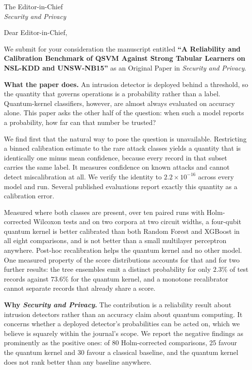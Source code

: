 \documentclass[11pt]{letter}
\begin{document}
\begin{letter}{%
  The Editor-in-Chief\\
  \textit{Security and Privacy}}

\opening{Dear Editor-in-Chief,}

We submit for your consideration the manuscript entitled \textbf{``A Reliability
and Calibration Benchmark of QSVM Against Strong Tabular Learners on NSL-KDD and
UNSW-NB15''} as an Original Paper in \textit{Security and Privacy}.

\medskip
\noindent\textbf{What the paper does.}
An intrusion detector is deployed behind a threshold, so the quantity that governs
operations is a probability rather than a label. Quantum-kernel classifiers,
however, are almost always evaluated on accuracy alone. This paper asks the other
half of the question: when such a model reports a probability, how far can that
number be trusted?

We find first that the natural way to pose the question is unavailable. Restricting
a binned calibration estimate to the rare attack classes yields a quantity that is
identically one minus mean confidence, because every record in that subset carries
the same label. It measures confidence on known attacks and cannot detect
miscalibration at all. We verify the identity to $2.2\times10^{-16}$ across every
model and run. Several published evaluations report exactly this quantity as a
calibration error.

Measured where both classes are present, over ten paired runs with Holm-corrected
Wilcoxon tests and on two corpora at two circuit widths, a four-qubit quantum kernel
is better calibrated than both Random Forest and XGBoost in all eight comparisons,
and is not better than a small multilayer perceptron anywhere. Post-hoc
recalibration helps the quantum kernel and no other model. One measured property of
the score distributions accounts for that and for two further results: the tree
ensembles emit a distinct probability for only $2.3\%$ of test records against
$73.6\%$ for the quantum kernel, and a monotone recalibrator cannot separate records
that already share a score.

\medskip
\noindent\textbf{Why \textit{Security and Privacy}.}
The contribution is a reliability result about intrusion detectors rather than an
accuracy claim about quantum computing. It concerns whether a deployed detector's
probabilities can be acted on, which we believe is squarely within the journal's
scope. We report the negative findings as prominently as the positive ones: of 80
Holm-corrected comparisons, 25 favour the quantum kernel and 30 favour a classical
baseline, and the quantum kernel does not rank better than any baseline anywhere.


\end{letter}
\end{document}
